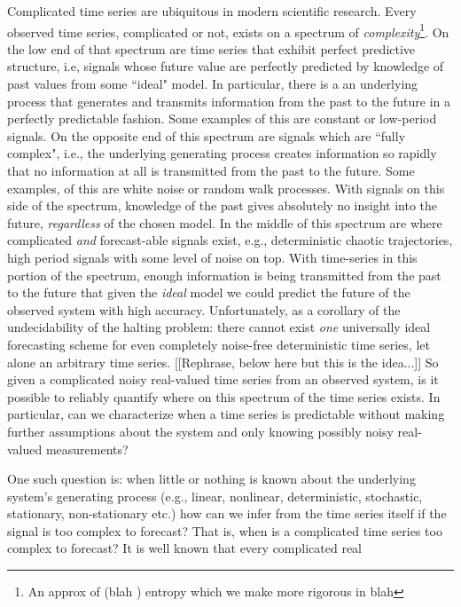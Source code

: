 Complicated time series are ubiquitous in modern scientific research. 
Every observed time series, complicated or not, exists on a spectrum of \emph{complexity}\footnote{An approx of (blah ) entropy which we make more rigorous in blah}. On the low end of that spectrum are time series that exhibit perfect predictive structure, i.e, signals whose future value are perfectly predicted by knowledge of past values from some ``ideal" model. In particular, there is a an underlying process that generates and transmits information from the past to the future in a perfectly predictable fashion. Some examples of this are constant or low-period signals. On the opposite end of this spectrum are signals which are ``fully complex", i.e., the underlying generating process creates information so rapidly that no information at all is transmitted from the past to the future. Some examples, of this are white noise or random walk processes. With signals on this side of the spectrum, knowledge of the past gives absolutely no insight into the future, \emph{regardless} of the chosen model.  In the middle of this spectrum are where complicated \emph{and} forecast-able signals exist, e.g., deterministic chaotic trajectories, high period signals with some level of noise on top. With time-series in this portion of the spectrum, enough information is being transmitted from the past to the future that given the \emph{ideal} model we could predict the future of the observed system with high accuracy. Unfortunately, as a corollary of the undecidability of the halting problem: there cannot exist \emph{one} universally ideal forecasting scheme for even completely noise-free deterministic time series, let alone an arbitrary time series.
[[Rephrase, below here but this is the idea...]]
 So given a complicated noisy real-valued time series from an observed system, is it possible to reliably quantify where on this spectrum of the time series exists. In particular, can we characterize when a time series is predictable without making further assumptions about the system and only knowing possibly noisy real-valued measurements?


One such question is: when little or nothing is known about the underlying system's generating process (e.g., linear, nonlinear, deterministic, stochastic, stationary, non-stationary etc.) how can we infer from the time series itself if the signal is too complex to forecast? That is, when is a complicated time series too complex to forecast? It is well known that every complicated real








